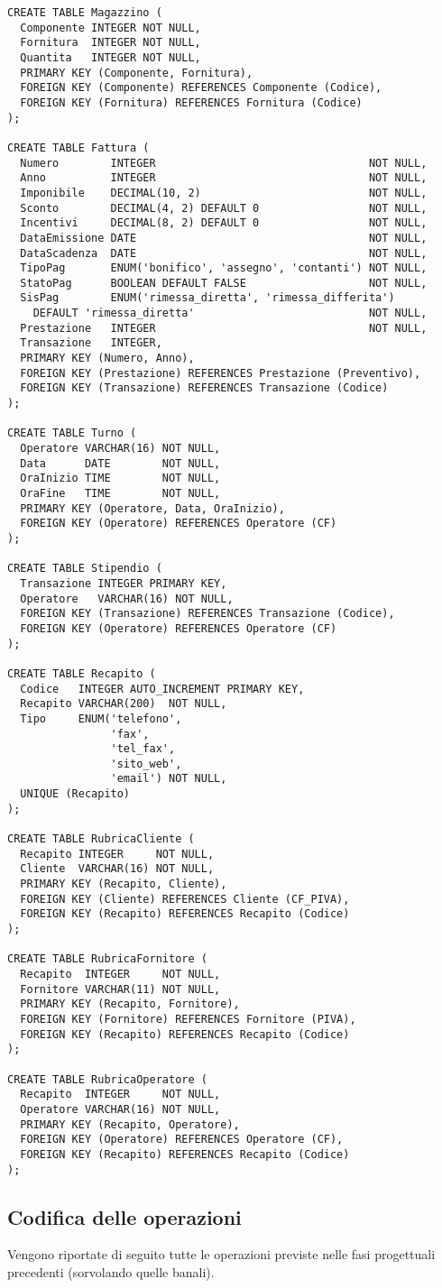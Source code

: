 \begin{lstlisting}
CREATE TABLE Magazzino (
  Componente INTEGER NOT NULL,
  Fornitura  INTEGER NOT NULL,
  Quantita   INTEGER NOT NULL,
  PRIMARY KEY (Componente, Fornitura),
  FOREIGN KEY (Componente) REFERENCES Componente (Codice),
  FOREIGN KEY (Fornitura) REFERENCES Fornitura (Codice)
);

CREATE TABLE Fattura (
  Numero        INTEGER                                 NOT NULL,
  Anno          INTEGER                                 NOT NULL,
  Imponibile    DECIMAL(10, 2)                          NOT NULL,
  Sconto        DECIMAL(4, 2) DEFAULT 0                 NOT NULL,
  Incentivi     DECIMAL(8, 2) DEFAULT 0                 NOT NULL,
  DataEmissione DATE                                    NOT NULL,
  DataScadenza  DATE                                    NOT NULL,
  TipoPag       ENUM('bonifico', 'assegno', 'contanti') NOT NULL,
  StatoPag      BOOLEAN DEFAULT FALSE                   NOT NULL,
  SisPag        ENUM('rimessa_diretta', 'rimessa_differita')
    DEFAULT 'rimessa_diretta'                           NOT NULL,
  Prestazione   INTEGER                                 NOT NULL,
  Transazione   INTEGER,
  PRIMARY KEY (Numero, Anno),
  FOREIGN KEY (Prestazione) REFERENCES Prestazione (Preventivo),
  FOREIGN KEY (Transazione) REFERENCES Transazione (Codice)
);

CREATE TABLE Turno (
  Operatore VARCHAR(16) NOT NULL,
  Data      DATE        NOT NULL,
  OraInizio TIME        NOT NULL,
  OraFine   TIME        NOT NULL,
  PRIMARY KEY (Operatore, Data, OraInizio),
  FOREIGN KEY (Operatore) REFERENCES Operatore (CF)
);

CREATE TABLE Stipendio (
  Transazione INTEGER PRIMARY KEY,
  Operatore   VARCHAR(16) NOT NULL,
  FOREIGN KEY (Transazione) REFERENCES Transazione (Codice),
  FOREIGN KEY (Operatore) REFERENCES Operatore (CF)
);

CREATE TABLE Recapito (
  Codice   INTEGER AUTO_INCREMENT PRIMARY KEY,
  Recapito VARCHAR(200)  NOT NULL,
  Tipo     ENUM('telefono',
                'fax',
                'tel_fax',
                'sito_web',
                'email') NOT NULL,
  UNIQUE (Recapito)
);

CREATE TABLE RubricaCliente (
  Recapito INTEGER     NOT NULL,
  Cliente  VARCHAR(16) NOT NULL,
  PRIMARY KEY (Recapito, Cliente),
  FOREIGN KEY (Cliente) REFERENCES Cliente (CF_PIVA),
  FOREIGN KEY (Recapito) REFERENCES Recapito (Codice)
);

CREATE TABLE RubricaFornitore (
  Recapito  INTEGER     NOT NULL,
  Fornitore VARCHAR(11) NOT NULL,
  PRIMARY KEY (Recapito, Fornitore),
  FOREIGN KEY (Fornitore) REFERENCES Fornitore (PIVA),
  FOREIGN KEY (Recapito) REFERENCES Recapito (Codice)
);

CREATE TABLE RubricaOperatore (
  Recapito  INTEGER     NOT NULL,
  Operatore VARCHAR(16) NOT NULL,
  PRIMARY KEY (Recapito, Operatore),
  FOREIGN KEY (Operatore) REFERENCES Operatore (CF),
  FOREIGN KEY (Recapito) REFERENCES Recapito (Codice)
);
		\end{lstlisting}


	\subsection{Codifica delle operazioni}
		Vengono riportate di seguito tutte le operazioni previste nelle fasi progettuali precedenti (sorvolando quelle banali).